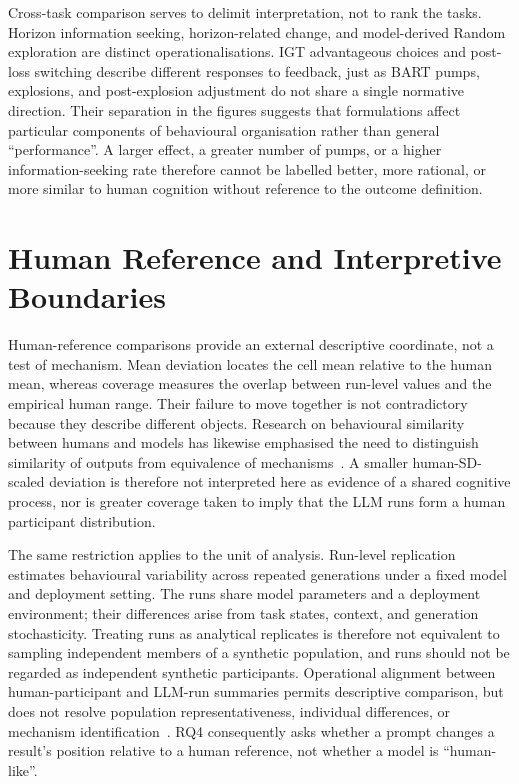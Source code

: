 \documentclass[logo,msc]{infthesis}
\begin{document}
Cross-task comparison serves to delimit interpretation, not to rank the tasks. Horizon information seeking, horizon-related change, and model-derived Random exploration are distinct operationalisations. IGT advantageous choices and post-loss switching describe different responses to feedback, just as BART pumps, explosions, and post-explosion adjustment do not share a single normative direction. Their separation in the figures suggests that formulations affect particular components of behavioural organisation rather than general ``performance''. A larger effect, a greater number of pumps, or a higher information-seeking rate therefore cannot be labelled better, more rational, or more similar to human cognition without reference to the outcome definition.

\section{Human Reference and Interpretive Boundaries}

Human-reference comparisons provide an external descriptive coordinate, not a test of mechanism. Mean deviation locates the cell mean relative to the human mean, whereas coverage measures the overlap between run-level values and the empirical human range. Their failure to move together is not contradictory because they describe different objects. Research on behavioural similarity between humans and models has likewise emphasised the need to distinguish similarity of outputs from equivalence of mechanisms~\cite{Lampinen2024ContentEffects,Lin2025SixFallacies}. A smaller human-SD-scaled deviation is therefore not interpreted here as evidence of a shared cognitive process, nor is greater coverage taken to imply that the LLM runs form a human participant distribution.

The same restriction applies to the unit of analysis. Run-level replication estimates behavioural variability across repeated generations under a fixed model and deployment setting. The runs share model parameters and a deployment environment; their differences arise from task states, context, and generation stochasticity. Treating runs as analytical replicates is therefore not equivalent to sampling independent members of a synthetic population, and runs should not be regarded as independent synthetic participants. Operational alignment between human-participant and LLM-run summaries permits descriptive comparison, but does not resolve population representativeness, individual differences, or mechanism identification~\cite{Dillion2023ReplaceParticipants,Bisbee2024SyntheticSurveyData}. RQ4 consequently asks whether a prompt changes a result's position relative to a human reference, not whether a model is ``human-like''.
\end{document}
